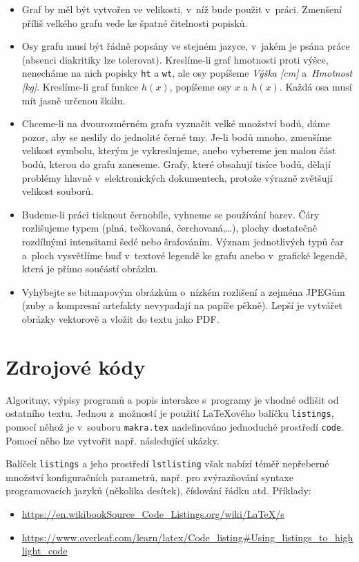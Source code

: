 \begin{itemize}
\item Graf by měl být vytvořen ve velikosti, v~níž bude použit
  v~práci. Zmenšení příliš velkého grafu vede ke špatné čitelnosti
  popisků.
\item Osy grafu musí být řádně popsány ve stejném jazyce, v~jakém je
  psána práce (absenci diakritiky lze tolerovat). Kreslíme-li graf
  hmotnosti proti výšce, nenecháme na nich popisky \texttt{ht} a
  \texttt{wt}, ale osy popíšeme \emph{Výška [cm]} a~\emph{Hmotnost
    [kg]}. Kreslíme-li graf funkce $h(x)$, popíšeme osy $x$ a $h(x)$.
  Každá osa musí mít jasně určenou škálu.
\item Chceme-li na dvourozměrném grafu vyznačit velké množství bodů,
  dáme pozor, aby se neslily do jednolité černé tmy. Je-li bodů mnoho,
  zmenšíme velikost symbolu, kterým je vykreslujeme, anebo vybereme
  jen malou část bodů, kterou do grafu zaneseme. Grafy, které obsahují
  tisíce bodů, dělají problémy hlavně v~elektronických dokumentech,
  protože výrazně zvětšují velikost souborů.
\item Budeme-li práci tisknout černobíle, vyhneme se používání barev.
  Čáry roz\-li\-šu\-je\-me typem (plná, tečkovaná, čerchovaná,\ldots), plochy
  dostatečně roz\-díl\-ný\-mi intensitami šedé nebo šrafováním. Význam
  jednotlivých typů čar a~ploch vysvětlíme buď v~textové legendě ke
  grafu anebo v~grafické legendě, která je přímo součástí obrázku.
\item Vyhýbejte se bitmapovým obrázkům o~nízkém rozlišení a zejména
  JPEGům (zuby a kompresní artefakty nevypadají na papíře pěkně).
  Lepší je vytvářet obrázky vektorově a vložit do textu jako PDF.
\end{itemize}


\section{Zdrojové kódy}
Algoritmy, výpisy programů a popis interakce s~programy je vhodné odlišit od ostatního textu. Jednou z~možností je použití {\LaTeX}o\-vé\-ho balíčku \texttt{listings}, pomocí něhož je v~souboru \texttt{makra.tex} nadefinováno jednoduché prostředí \texttt{code}. Pomocí něho lze vytvořit např. následující ukázky.


Balíček \texttt{listings} a jeho prostředí \texttt{lstlisting} však nabízí téměř nepřeberné množství konfiguračních parametrů, např. pro zvýrazňování syntaxe programovacích jazyků (několika desítek), číslování řádku atd. Příklady:
\begin{itemize}
\item \url{https://en.wikibookSource_Code_Listings.org/wiki/LaTeX/s}
\item \url{https://www.overleaf.com/learn/latex/Code_listing#Using_listings_to_highlight_code}
\end{itemize}


